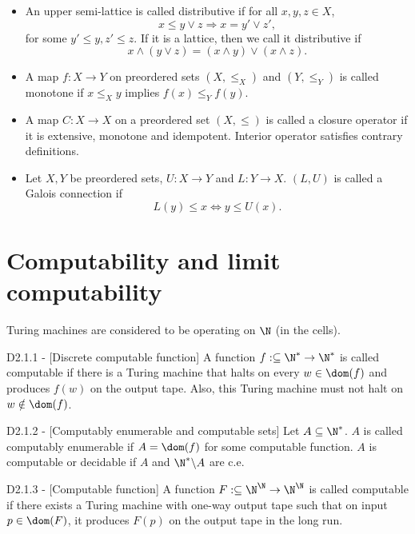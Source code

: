 \documentclass[12pt]{article}
\begin{document}
\begin{itemize}
    \item An upper semi-lattice is called distributive if for all $x,y,z \in X$,
    \[ x \leq y \vee z \Rightarrow x = y' \vee z',\]
    for some $y'\leq y,z'\leq z$. If it is a lattice, then we call it distributive if 
    \[ x \wedge (y \vee z) = (x \wedge y) \vee (x \wedge z).\] 
    \item A map $f : X \to Y$ on preordered sets $(X,\leq_X)$ and $(Y,\leq_Y)$ is called monotone if $x \leq_X y$ implies $f(x) \leq_Y f(y)$.
    \item A map $C : X \to X$ on a preordered set $(X,\leq)$ is called a closure operator if it is extensive, monotone and idempotent. Interior operator satisfies contrary definitions.
    \item Let $X,Y$ be preordered sets, $U: X \to Y$ and $L:Y \to X$. $(L,U)$ is called a Galois connection if 
    \[ L(y) \leq x \Leftrightarrow y \leq U(x).\]
\end{itemize}


\section{Computability and limit computability}

Turing machines are considered to be operating on $\N$ (in the cells).
\begin{flexidefinition}{D2.1.1 - }[Discrete computable function]
    A function $f : \subseteq \N^\ast \to \N^\ast$ is called computable if there is a Turing machine that halts on every $w\in \dom(f)$ and produces $f(w)$ on the output tape. Also, this Turing machine must not halt on $w \notin \dom(f)$.
\end{flexidefinition}

\begin{flexidefinition}{D2.1.2 - }[Computably enumerable and computable sets]
    Let $A \subseteq \N^\ast$. $A$ is called computably enumerable if $A = \dom(f)$ for some computable function. $A$ is computable or decidable if $A$ and $\N^\ast \backslash A$ are c.e.
\end{flexidefinition}

\begin{flexidefinition}{D2.1.3 - }[Computable function]
    A function $F : \subseteq \N^\N \to \N^\N$ is called computable if there exists a Turing machine with one-way output tape such that on input $p \in \dom(F)$, it produces $F(p)$ on the output tape in the long run.
\end{flexidefinition}
\end{document}
